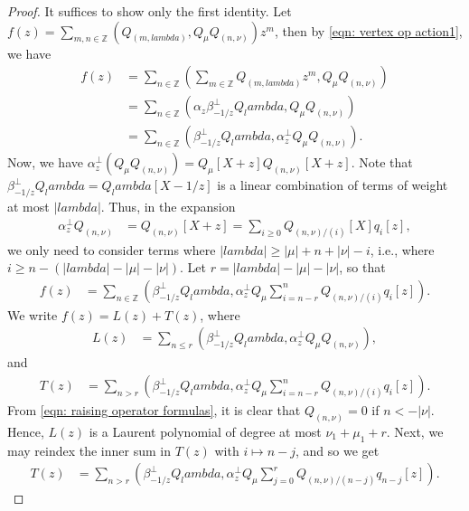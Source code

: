 \documentclass[12pt]{amsart}%
\def\lambda{lambda}%
\theoremstyle{remark}
\theoremstyle{definition}
\newcommand{\Z}{\mathbb{Z}}
\begin{document}
    \begin{proof}
        It suffices to show only the first identity. Let $f(z)=\sum_{m,n\in\Z}\left(Q_{(m,\lambda)},Q_\mu Q_{(n,\nu)}\right)z^m$, then by \eqref{eqn: vertex op action1}, we have
        \begin{align*}
            f(z)&=\sum_{n\in\Z}\left(\sum_{m\in\Z}Q_{(m,\lambda)}z^m,Q_\mu Q_{(n,\nu)}\right)\\
            &=\sum_{n\in\Z}\left(\alpha_z\beta_{-1/z}^\perp Q_\lambda,Q_\mu Q_{(n,\nu)}\right)\\
            &=\sum_{n\in\Z}\left(\beta_{-1/z}^\perp Q_\lambda,\alpha_z^\perp Q_\mu Q_{(n,\nu)}\right).
        \end{align*}
        Now, we have $\alpha_z^\perp(Q_\mu Q_{(n,\nu)})=Q_\mu[X+z]Q_{(n,\nu)}[X+z]$. Note that $\beta_{-1/z}^\perp Q_\lambda=Q_\lambda[X-1/z]$ is a linear combination of terms of weight at most $|\lambda|$. Thus, in the expansion
        \begin{align*}
            \alpha_z^\perp Q_{(n,\nu)}&=Q_{(n,\nu)}[X+z]=\sum_{i\geq0}Q_{(n,\nu)/(i)}[X]q_i[z],
        \end{align*}
        we only need to consider terms where $|\lambda|\geq |\mu|+n+|\nu|-i$, i.e., where $i\geq n-(|\lambda|-|\mu|-|\nu|)$. Let $r=|\lambda|-|\mu|-|\nu|$, so that
        \begin{align*}
            f(z)&=\sum_{n\in\Z}\left(\beta_{-1/z}^\perp Q_\lambda,\alpha_z^\perp Q_\mu \sum_{i=n-r}^nQ_{(n,\nu)/(i)}q_i[z]\right).
        \end{align*}
        We write $f(z)=L(z)+T(z)$, where
        \begin{align*}
            L(z)&=\sum_{n\leq r}\left(\beta_{-1/z}^\perp Q_\lambda,\alpha_z^\perp Q_\mu Q_{(n,\nu)}\right),
        \end{align*}
        and
        \begin{align*}
            T(z)&=\sum_{n>r}\left(\beta_{-1/z}^\perp Q_\lambda,\alpha_z^\perp Q_\mu \sum_{i=n-r}^nQ_{(n,\nu)/(i)}q_i[z]\right).
        \end{align*}
        From \eqref{eqn: raising operator formulas}, it is clear that $Q_{(n,\nu)}=0$ if $n<-|\nu|$. Hence, $L(z)$ is a Laurent polynomial of degree at most $\nu_1+\mu_1+r$. Next, we may reindex the inner sum in $T(z)$ with $i\mapsto n-j$, and so we get
        \begin{align*}
            T(z)&=\sum_{n>r}\left(\beta_{-1/z}^\perp Q_\lambda,\alpha_z^\perp Q_\mu \sum_{j=0}^rQ_{(n,\nu)/(n-j)}q_{n-j}[z]\right).
        \end{align*}

\end{proof}
\end{document}
